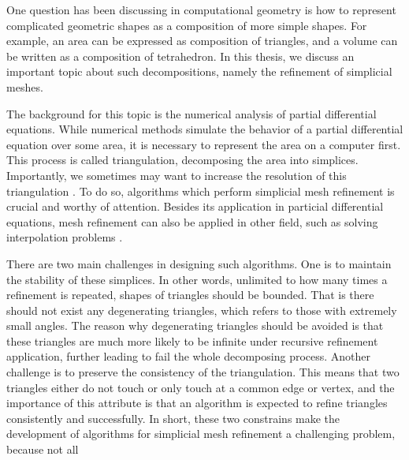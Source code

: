 One question has been discussing in computational geometry is how to represent complicated geometric shapes as a composition of more simple shapes. For example, an area can be expressed as composition of triangles, and a volume can be written as a composition of tetrahedron. In this thesis, we discuss an important topic about such decompositions, namely the refinement of simplicial meshes.

The background for this topic is the numerical analysis of partial differential equations. While numerical methods simulate the behavior of a partial differential equation over some area, it is necessary  to represent the area on a computer first. This process is called triangulation, decomposing the area into simplices. Importantly, we sometimes may want to increase the resolution of this triangulation \cite{grosso1998hierarchical}. To do so, algorithms which perform simplicial mesh refinement is crucial and worthy of attention. Besides its application in particial differential equations, mesh refinement can also be applied in other field, such as solving interpolation problems \cite{moore1992simplical}.

There are two main challenges in designing such algorithms. One is to maintain the stability of these simplices. In other words, unlimited to how many times a refinement is repeated, shapes of triangles should be bounded. That is there should not exist any degenerating triangles, which refers to those with extremely small angles. The reason why degenerating triangles should be avoided is that these triangles are much more likely to be infinite under recursive refinement application, further leading to fail the whole decomposing process. Another challenge is to  preserve the consistency of the triangulation. This means that two triangles either do not touch or only touch at a common edge or vertex, and the importance of this attribute is that an algorithm is expected to refine triangles consistently and successfully. In short, these two constrains make the development of algorithms for simplicial mesh refinement a challenging problem, because not all  

